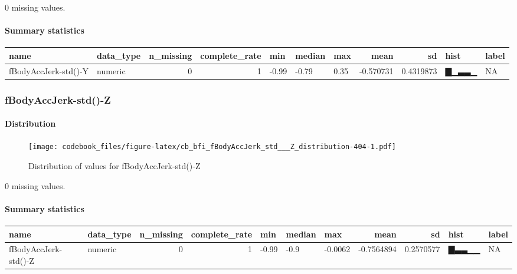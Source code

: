 \documentclass[
]{article}
\begin{document}
0 missing values.

\hypertarget{fBodyAccJerk_std___Y_summary}{%
\paragraph{Summary statistics}\label{fBodyAccJerk_std___Y_summary}}

\begin{longtable}[]{@{}llrrlllrrll@{}}
\toprule
name & data\_type & n\_missing & complete\_rate & min & median & max &
mean & sd & hist & label \\
\midrule
\endhead
fBodyAccJerk-std()-Y & numeric & 0 & 1 & -0.99 & -0.79 & 0.35 &
-0.570731 & 0.4319873 & ▇▁▃▃▁ & NA \\
\bottomrule
\end{longtable}

\hypertarget{fBodyAccJerk_std___Z}{%
\subsubsection{fBodyAccJerk-std()-Z}\label{fBodyAccJerk_std___Z}}

\hypertarget{fBodyAccJerk_std___Z_distribution}{%
\paragraph{Distribution}\label{fBodyAccJerk_std___Z_distribution}}

\begin{figure}
\centering
\texttt{[image: codebook\_files/figure-latex/cb\_bfi\_fBodyAccJerk\_std\_\_\_Z\_distribution-404-1.pdf]}
\caption{Distribution of values for fBodyAccJerk-std()-Z}
\end{figure}

0 missing values.

\hypertarget{fBodyAccJerk_std___Z_summary}{%
\paragraph{Summary statistics}\label{fBodyAccJerk_std___Z_summary}}

\begin{longtable}[]{@{}llrrlllrrll@{}}
\toprule
name & data\_type & n\_missing & complete\_rate & min & median & max &
mean & sd & hist & label \\
\midrule
\endhead
fBodyAccJerk-std()-Z & numeric & 0 & 1 & -0.99 & -0.9 & -0.0062 &
-0.7564894 & 0.2570577 & ▇▃▃▁▁ & NA \\
\bottomrule
\end{longtable}
\end{document}
